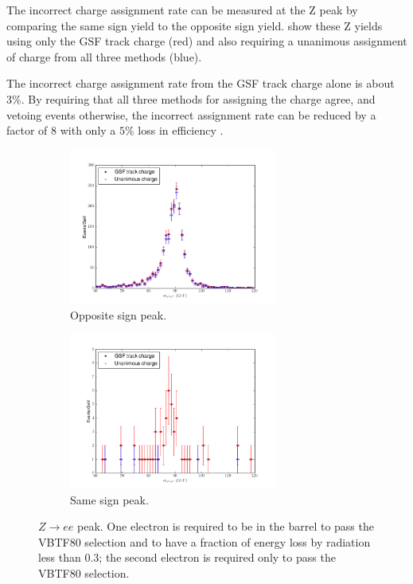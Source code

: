 The incorrect charge assignment rate can be measured at the Z peak by comparing
the same sign \HepProcess{\PZ\to\Pepm\Pepm} yield to the opposite sign
\HepProcess{\PZ\to\Pelectron\APelectron} yield.  show these
Z yields using only the {GSF} track charge (red) and also requiring a unanimous
assignment of charge from all three methods (blue). 

The incorrect charge assignment rate from the GSF track charge alone is about
$3\%$.  By requiring that all three methods for assigning the charge agree, and
vetoing events otherwise, the incorrect assignment rate can be reduced by a
factor of 8 with only a $5\%$ loss in efficiency \cite{baisini2010electron}.

\begin{figure}[htbp]
  \centering
  \begin{subfigure}{\textwidth}
    \centering
    \includegraphics[width=0.75\textwidth]{zpeak_os}
    \caption{Opposite sign \PZ peak.}
    \label{fig:zpeak_os}
  \end{subfigure}
  \begin{subfigure}{\textwidth}
    \centering
    \includegraphics[width=0.75\textwidth]{zpeak_ss}
    \caption{Same sign \PZ peak.}
    \label{fig:zpeak_ss}
  \end{subfigure}
  \caption[$Z\rightarrow ee$ peak.]{ $Z\rightarrow ee$ peak. One electron is required to be in the
barrel to pass the VBTF80 selection and to have a fraction of energy loss by
radiation less than 0.3; the second electron is required only to pass the VBTF80
selection\cite{baisini2010electron}.}\label{fig:zpeak} 
\end{figure}

